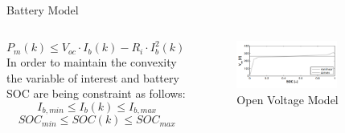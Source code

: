 \documentclass{beamer}
\begin{document}
\begin{frame}{Battery Model}
\begin{columns}
\begin{column}{0.45\textwidth}
   
    \begin{equation*}
  P_m(k) \leq V_{oc} \cdot I_b(k) − R_i \cdot I^2_b(k) − P_{aux} 
\end{equation*}
In order to maintain the convexity the variable of interest and battery SOC are being constraint as follows:
\begin{equation*}
  I_{b,min} \leq I_b(k) \leq I_{b,max} 
\end{equation*}
\begin{equation*}
  SOC_{min} \leq SOC(k) \leq SOC_{max} 
\end{equation*}
 \end{column}
\begin{column}{0.55\textwidth}
    \begin{figure}
    \centering
        \includegraphics[width=0.7\textwidth, height=1\textwidth]{Voltage model .png}
        \caption{Open Voltage Model}
    \end{figure}
\end{column}
\end{columns}

\end{frame}
\end{document}
